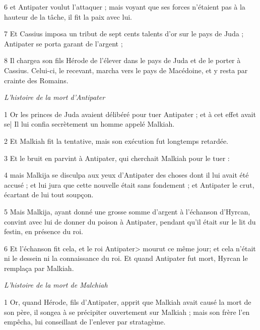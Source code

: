\par 6 et Antipater voulut l'attaquer ; mais voyant que ses forces n'étaient pas à la hauteur de la tâche, il fit la paix avec lui.

\par 7 Et Cassius imposa un tribut de sept cents talents d'or sur le pays de Juda ; Antipater se porta garant de l'argent ;

\par 8 Il chargea son fils Hérode de l'élever dans le pays de Juda et de le porter à Cassius. Celui-ci, le recevant, marcha vers le pays de Macédoine, et y resta par crainte des Romains.


\par \textit{L'histoire de la mort d'Antipater}

\par 1 Or les princes de Juda avaient délibéré pour tuer Antipater ; et à cet effet avait se| Il lui confia secrètement un homme appelé Malkiah.

\par 2 Et Malkiah fit la tentative, mais son exécution fut longtemps retardée.

\par 3 Et le bruit en parvint à Antipater, qui cherchait Malkiah pour le tuer :

\par 4 mais Malkija se disculpa aux yeux d'Antipater des choses dont il lui avait été accusé ; et lui jura que cette nouvelle était sans fondement ; et Antipater le crut, écartant de lui tout soupçon.

\par 5 Mais Malkija, ayant donné une grosse somme d'argent à l'échanson d'Hyrcan, convint avec lui de donner du poison à Antipater, pendant qu'il était sur le lit du festin, en présence du roi.

\par 6 Et l'échanson fit cela, et le roi Antipater> mourut ce même jour; et cela n'était ni le dessein ni la connaissance du roi. Et quand Antipater fut mort, Hyrcan le remplaça par Malkiah.


\par \textit{L'histoire de la mort de Malchiah}

\par 1 Or, quand Hérode, fils d'Antipater, apprit que Malkiah avait causé la mort de son père, il songea à se précipiter ouvertement sur Malkiah ; mais son frère l'en empêcha, lui conseillant de l'enlever par stratagème.

